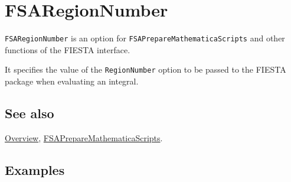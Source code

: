 \documentclass[../FeynHelpersManual.tex]{subfiles}
\begin{document}
\hypertarget{fsaregionnumber}{
\section{FSARegionNumber}\label{fsaregionnumber}}

\texttt{FSARegionNumber} is an option for
\texttt{FSAPrepareMathematicaScripts} and other functions of the FIESTA
interface.

It specifies the value of the \texttt{RegionNumber} option to be passed
to the FIESTA package when evaluating an integral.

\subsection{See also}

\hyperlink{toc}{Overview},
\hyperlink{fsapreparemathematicascripts}{FSAPrepareMathematicaScripts}.

\subsection{Examples}
\end{document}
